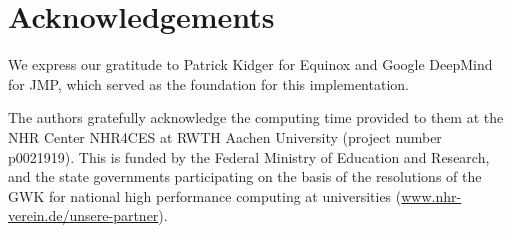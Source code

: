 \documentclass[10pt, a4paper, logo, onecolumn, internal, copyright]{dsme}
\begin{document}
\section{Acknowledgements}
We express our gratitude to Patrick Kidger for Equinox and Google DeepMind for JMP, which served as the foundation for this implementation.

The authors gratefully acknowledge the computing time provided to them at the NHR Center NHR4CES at RWTH Aachen University (project number p0021919). This is funded by the Federal Ministry of Education and Research, and the state governments participating on the basis of the resolutions of the GWK for national high performance computing at universities (\url{www.nhr-verein.de/unsere-partner}).






\end{document}

